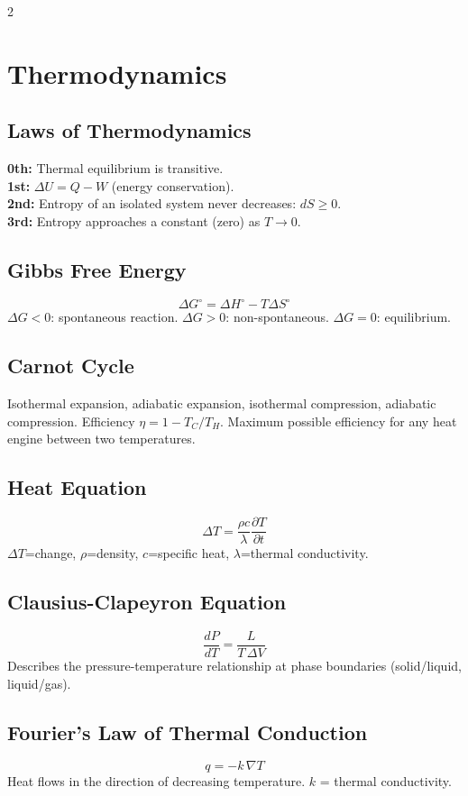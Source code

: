 \documentclass[10pt,a4paper]{article}
\begin{document}
\begin{multicols}{2}
\section{Thermodynamics}

\subsection{Laws of Thermodynamics}
\textbf{0th:} Thermal equilibrium is transitive.\\
\textbf{1st:} $\Delta U = Q - W$ (energy conservation).\\
\textbf{2nd:} Entropy of an isolated system never decreases: $dS \geq 0$.\\
\textbf{3rd:} Entropy approaches a constant (zero) as $T \to 0$.

\subsection{Gibbs Free Energy}
\[
\Delta G^\circ = \Delta H^\circ - T\Delta S^\circ
\]
$\Delta G < 0$: spontaneous reaction. $\Delta G > 0$: non-spontaneous. $\Delta G = 0$: equilibrium.

\subsection{Carnot Cycle}
Isothermal expansion, adiabatic expansion, isothermal compression, adiabatic compression. Efficiency $\eta = 1 - T_C/T_H$. Maximum possible efficiency for any heat engine between two temperatures.

\subsection{Heat Equation}
\[
\Delta T = \frac{\rho c}{\lambda}\frac{\partial T}{\partial t}
\]
$\Delta T$=change, $\rho$=density, $c$=specific heat, $\lambda$=thermal conductivity.

\subsection{Clausius-Clapeyron Equation}
\[
\frac{dP}{dT} = \frac{L}{T\,\Delta V}
\]
Describes the pressure-temperature relationship at phase boundaries (solid/liquid, liquid/gas).

\subsection{Fourier's Law of Thermal Conduction}
\[
q = -k\,\nabla T
\]
Heat flows in the direction of decreasing temperature. $k$ = thermal conductivity.


\end{multicols}
\end{document}
